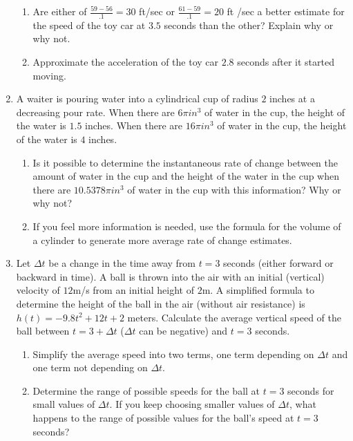 \documentclass[12pt]{report}
\begin{document}
\begin{enumerate}
\begin{enumerate}
\item Are either of $\frac{59-56}{.1}=30$ ft/sec or $\frac{61-59}{.1}=20$ ft /sec a better estimate for the speed of the toy car at $3.5$ seconds than the other? Explain why or why not. 

\item  Approximate the acceleration of the toy car $2.8$ seconds after it started moving.

\end{enumerate}

\vspace{24pt}

\item A waiter is pouring water into a cylindrical cup of radius $2$ inches at a decreasing pour rate. When there are $6\pi in^3$ of water in the cup, the height of the water is $1.5$ inches. When there are $16\pi in^3$ of water in the cup, the height of the water is $4$ inches. 

\begin{enumerate}

\item Is it possible to determine the instantaneous rate of change between the amount of water in the cup and the height of the water in the cup when there are $10.5378\pi in^3$ of water in the cup with this information? Why or why not?

\item If you feel more information is needed, use the formula for the volume of a cylinder to generate more average rate of change estimates. 


\end{enumerate}

\pagebreak

\item Let $\Delta t$ be a change in the time away from $t=3$ seconds (either forward or backward in time). A ball is thrown into the air with an initial (vertical) velocity of $12$m/s from an initial height of $2$m. A simplified formula to determine the height of the ball in the air (without air resistance) is $h(t)=-9.8t^2+12t+2$ meters. Calculate the average vertical speed of the ball between $t=3+\Delta t$ ($\Delta t$ can be negative) and $t=	3$ seconds. 


\begin{enumerate}

\item Simplify the average speed into two terms, one term depending on $\Delta t$ and one term not depending on $\Delta t$. 

\item Determine the range of possible speeds for the ball at $t=3$ seconds for small values of $\Delta t$. If you keep choosing smaller values of $\Delta t$, what happens to the range of possible values for the ball's speed at $t=3$ seconds?

\end{enumerate}

\end{enumerate}
\end{document}
